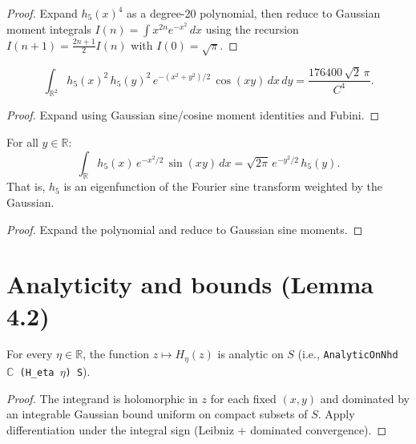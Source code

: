 \begin{proof}
  \leanok
  Expand $h_5(x)^4$ as a degree-20 polynomial, then reduce to
  Gaussian moment integrals $I(n) = \int x^{2n} e^{-x^2}\,dx$ using the recursion
  $I(n+1) = \frac{2n+1}{2} I(n)$ with $I(0) = \sqrt{\pi}$.
\end{proof}

\begin{lemma}
  \label{lem:4_1_eq27}
  \leanok
  \[
    \int_{\mathbb{R}^2} h_5(x)^2\, h_5(y)^2\,
    e^{-(x^2+y^2)/2}\, \cos(xy)\,dx\,dy
    = \frac{176400\,\sqrt{2}\,\pi}{C^4}.
  \]
\end{lemma}

\begin{proof}
  \leanok
  Expand using Gaussian sine/cosine moment identities and Fubini.
\end{proof}

\begin{lemma}
  \label{lem:4_4_eq55}
  \leanok
  For all $y \in \mathbb{R}$:
  \[
    \int_{\mathbb{R}} h_5(x)\, e^{-x^2/2}\, \sin(xy)\,dx
    = \sqrt{2\pi}\, e^{-y^2/2}\, h_5(y).
  \]
  That is, $h_5$ is an eigenfunction of the Fourier sine transform weighted by the Gaussian.
\end{lemma}

\begin{proof}
  \leanok
  Expand the polynomial and reduce to Gaussian sine moments.
\end{proof}

\chapter{Analyticity and bounds (Lemma 4.2)}

\begin{lemma}
  \label{lem:H_eta_analytic}
  \leanok
  For every $\eta \in \mathbb{R}$, the function $z \mapsto H_\eta(z)$
  is analytic on $S$ (i.e., \texttt{AnalyticOnNhd~$\mathbb{C}$~(H\_eta~$\eta$)~S}).
\end{lemma}

\begin{proof}
  \leanok
  The integrand is holomorphic in $z$ for each fixed $(x,y)$ and dominated
  by an integrable Gaussian bound uniform on compact subsets of $S$.
  Apply differentiation under the integral sign (Leibniz + dominated convergence).
\end{proof}

